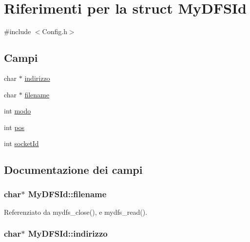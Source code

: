 \hypertarget{structMyDFSId}{}\section{Riferimenti per la struct My\+D\+F\+S\+Id}
\label{structMyDFSId}


{\ttfamily \#include $<$Config.\+h$>$}

\subsection*{Campi}
\begin{DoxyCompactItemize}
\item 
char $\ast$ \hyperlink{structMyDFSId_ac8c10a1a5b18776bf5e5585ee9e26331}{indirizzo}
\item 
char $\ast$ \hyperlink{structMyDFSId_ac0e1b8c96d859982c1a7d49f9e929e48}{filename}
\item 
int \hyperlink{structMyDFSId_a98bc5ce1a7734459d8b81c997da4e9f0}{modo}
\item 
int \hyperlink{structMyDFSId_aaeac229fb85c313f91a76f00be916832}{pos}
\item 
int \hyperlink{structMyDFSId_a382a74f109962751085cea7aac2892cc}{socket\+Id}
\end{DoxyCompactItemize}


\subsection{Documentazione dei campi}
\hypertarget{structMyDFSId_ac0e1b8c96d859982c1a7d49f9e929e48}{}
\subsubsection[{filename}]{\setlength{\rightskip}{0pt plus 5cm}char$\ast$ My\+D\+F\+S\+Id\+::filename}\label{structMyDFSId_ac0e1b8c96d859982c1a7d49f9e929e48}


Referenziato da mydfs\+\_\+close(), e mydfs\+\_\+read().

\hypertarget{structMyDFSId_ac8c10a1a5b18776bf5e5585ee9e26331}{}
\subsubsection[{indirizzo}]{\setlength{\rightskip}{0pt plus 5cm}char$\ast$ My\+D\+F\+S\+Id\+::indirizzo}\label{structMyDFSId_ac8c10a1a5b18776bf5e5585ee9e26331}
\hypertarget{structMyDFSId_a98bc5ce1a7734459d8b81c997da4e9f0}{}
